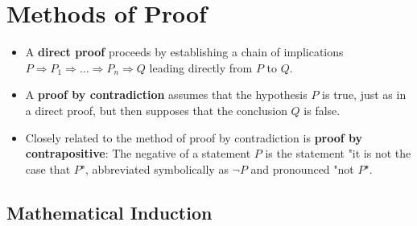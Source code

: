 \section{Methods of Proof}

\begin{itemize}
    \item A \textbf{direct proof} proceeds by establishing a chain of implications $P \Rightarrow P_1 \Rightarrow \dots \Rightarrow P_n \Rightarrow Q$ leading directly from $P$ to $Q$. \\

    \item A \textbf{proof by contradiction} assumes that the hypothesis $P$ is true, just as in a direct proof, but then supposes that the conclusion $Q$ is false. \\

    \item Closely related to the method of proof by contradiction is \textbf{proof by contrapositive}: The negative of a statement $P$ is the statement "it is not the case that $P$", abbreviated symbolically as $\neg P$ and pronounced "not $P$".
\end{itemize}

\subsection{Mathematical Induction}

